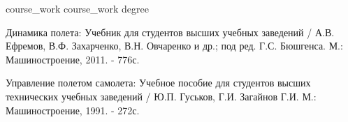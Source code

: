 \documentclass[bachelor, 14pt, substylefile = spbu.rtx]{disser}
\begin{document}

\newpage
\renewcommand{\contentsname}{\center{\large СОДЕРЖАНИЕ}}
\tableofcontents
{course_work}
{course_work}
{degree}


\begin{thebibliography}{2}
Динамика полета: Учебник для студентов высших учебных
заведений / А.В. Ефремов, В.Ф. Захарченко, В.Н. Овчаренко и др.; под ред. Г.С.
Бюшгенса. М.: Машиностроение, 2011. - 776с.

Управление полетом самолета: Учебное пособие для
студентов высших технических учебных заведений / Ю.П. Гуськов, Г.И. Загайнов
Г.И. М.: Машиностроение, 1991. - 272с. 
\end{thebibliography}
\end{document}
